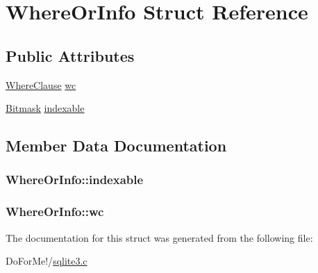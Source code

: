 \hypertarget{struct_where_or_info}{\section{Where\-Or\-Info Struct Reference}
\label{struct_where_or_info}
}
\subsection*{Public Attributes}
\begin{DoxyCompactItemize}
\item 
\hyperlink{struct_where_clause}{Where\-Clause} \hyperlink{struct_where_or_info_a45bb04e5ea24ec549f060bc8b210ec71}{wc}
\item 
\hyperlink{sqlite3_8c_afa77b629897c4457bfdc47d364ba5c3f}{Bitmask} \hyperlink{struct_where_or_info_a39777f291e1e516f01b05b71a9805357}{indexable}
\end{DoxyCompactItemize}


\subsection{Member Data Documentation}
\hypertarget{struct_where_or_info_a39777f291e1e516f01b05b71a9805357}{
\subsubsection[{indexable}]{ Where\-Or\-Info\-::indexable}}\label{struct_where_or_info_a39777f291e1e516f01b05b71a9805357}
\hypertarget{struct_where_or_info_a45bb04e5ea24ec549f060bc8b210ec71}{
\subsubsection[{wc}]{ Where\-Or\-Info\-::wc}}\label{struct_where_or_info_a45bb04e5ea24ec549f060bc8b210ec71}


The documentation for this struct was generated from the following file\-:\begin{DoxyCompactItemize}
\item 
Do\-For\-Me!/\hyperlink{sqlite3_8c}{sqlite3.\-c}\end{DoxyCompactItemize}
